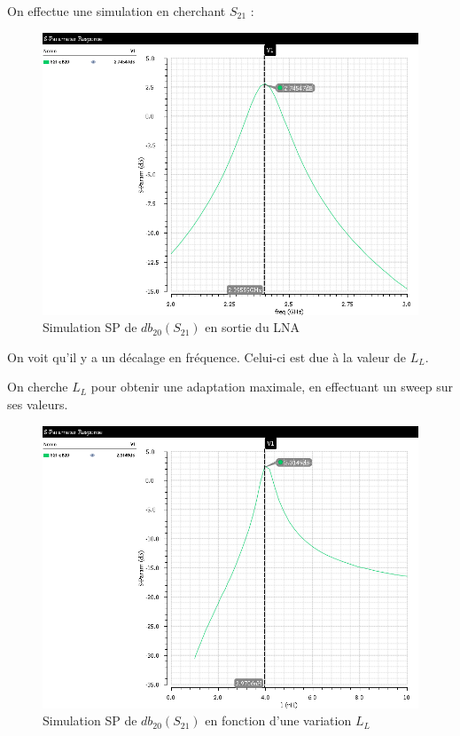 \documentclass[a4paper]{article}
\begin{document}
\clearpage

On effectue une simulation en cherchant $S_{21}$ :

\begin{figure}[!htb]
\begin{center}
  \includegraphics[scale=0.45]{Q4-S21.png}
  \caption{Simulation SP de $db_{20} (S_{21})$ en sortie du LNA}
  \label{schema-pol}
\end{center}
\end{figure}

On voit qu'il y a un d\'ecalage en fr\'equence. Celui-ci est due \`a la valeur de $L_L$.

On cherche $L_L$ pour obtenir une adaptation maximale, en effectuant un sweep sur ses valeurs.

\begin{figure}[!htb]
\begin{center}
  \includegraphics[scale=0.45]{Q4-S21-newL_l.png}
  \caption{Simulation SP de $db_{20} (S_{21})$ en fonction d'une variation $L_L$ }
  \label{newLL}
\end{center}
\end{figure}
\end{document}
